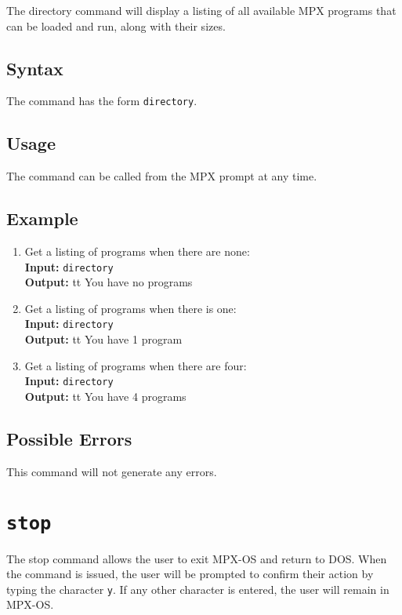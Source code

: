 The directory command will display a listing of all available MPX programs that can be
loaded and run, along with their sizes.

\subsection{Syntax}

The command has the form {\tt directory}.

\subsection{Usage}

The command can be called from the MPX prompt at any time.

\subsection{Example}
\begin{enumerate}
    \item Get a listing of programs when there are none: \\
        {\bf Input:} {\tt directory} \\
        {\bf Output:} {tt You have no programs}
    \item Get a listing of programs when there is one: \\
        {\bf Input:} {\tt directory} \\
        {\bf Output:} {tt You have 1 program}
    \item Get a listing of programs when there are four: \\
        {\bf Input:} {\tt directory} \\
        {\bf Output:} {tt You have 4 programs}
\end{enumerate}

\subsection{Possible Errors}
This command will not generate any errors.








\section{\tt stop}
\label{stop_cmd}

The stop command allows the user to exit MPX-OS and return to DOS. When the command is
issued, the user will be prompted to confirm their action by typing the character {\tt y}.
If any other character is entered, the user will remain in MPX-OS.

